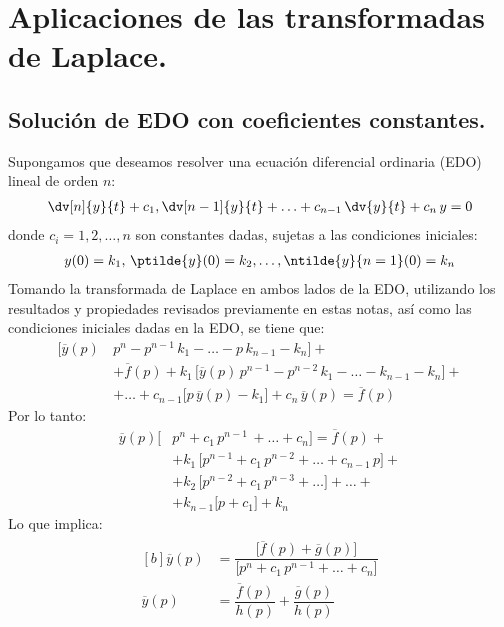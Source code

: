 \section{Aplicaciones de las transformadas de Laplace.}

\subsection{Solución de EDO con coeficientes constantes.}

Supongamos que deseamos resolver una ecuación diferencial ordinaria (EDO) lineal de orden $n$:
\begin{align}
\dv[n]{y}{t} + c_{1} , \dv[n-1]{y}{t} + \ldots + c_{n-1} \, \dv{y}{t} + c_{n} \, y = 0
\label{eq:ecuacion_04_54}
\end{align}
donde $c_{i} = 1, 2, \ldots, n$ son constantes dadas, sujetas a las condiciones iniciales:
\begin{align*}
y(0) = k_{1}, \, \ptilde{y}(0) = k_{2} , \ldots, \ntilde{y}{n=1}(0)= k_{n}
\end{align*}
Tomando la transformada de Laplace en ambos lados de la EDO, utilizando los resultados y propiedades revisados previamente en estas notas, así como las condiciones iniciales dadas en la EDO, se tiene que:
\begin{align*}
\big[\overline{y}(p) \, &p^{n} - p^{n-1} \, k_{1} - \ldots - p \, k_{n-1} - k_{n} \big] + \\[0.5em] &+ \overline{f}(p) + k_{1} \, \big[\overline{y}(p) \, p^{n-1} - p^{n-2} \, k_{1} - \ldots - k_{n-1} - k_{n} \big] + \\[0.5em]
&+ \ldots + c_{n-1} \big[p \, \overline{y}(p) - k_{1} \big] + c_{n} \, \overline{y}(p) = \overline{f}(p)
\end{align*}
Por lo tanto:
\begin{align*}
\overline{y}(p) \big[&p^{n} + c_{1} \, p^{n-1} \, + \ldots + c_{n} \big] = \overline{f}(p) + \\[0.5em]
&+ k_{1} \, \big[p^{n-1} + c_{1} \, p^{n-2} + \ldots + c_{n-1} \, p\big] + \\[0.5em]
&+ k_{2} \, \big[p^{n-2} + c_{1} \, p^{n-3} + \ldots \big] +  \ldots + \\[0.5em]
&+ k_{n-1} \big[p + c_{1} \big] + k_{n}
\end{align*}
Lo que implica:
\begin{align}
\begin{aligned}[b]
\overline{y}(p) &= \dfrac{\big[\overline{f}(p) + \overline{g}(p) \big]}{\big[p^{n}+ c_{1} \, p^{n-1} + \ldots + c_{n}\big]} \\[0.5em]
\overline{y}(p) &= \dfrac{\overline{f}(p)}{h(p)} + \dfrac{\overline{g}(p)}{h(p)}
\end{aligned}
\label{eq:ecuacion_04_55}
\end{align}
